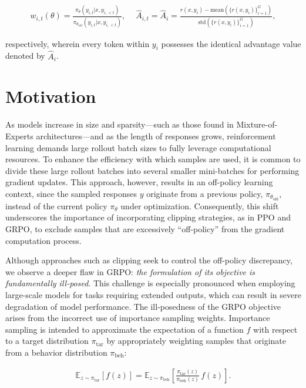 \begin{align}
    w_{i,t}(\theta)=\frac{ \pi_{\theta} (y_{i,t} | x, y_{i,<t}) }{ \pi_{\theta_\text{old}} (y_{i,t} | x,y_{i,<t})},\quad\ 
    \widehat{A}_{i,t} = \widehat{A}_{i} = \frac{r(x, y_i) - \mathrm{mean} \left( \{ r(x, y_i) \}_{i=1}^G \right) }{ \mathrm{std} \left( \{ r(x, y_i) \}_{i=1}^G \right) },
\end{align}

respectively, wherein every token within $y_i$ possesses the identical advantage value denoted by $\widehat{A}_{i}$.

\section{Motivation}
\label{sec:motivation}

As models increase in size and sparsity—such as those found in Mixture-of-Experts architectures—and as the length of responses grows, reinforcement learning demands large rollout batch sizes to fully leverage computational resources. To enhance the efficiency with which samples are used, it is common to divide these large rollout batches into several smaller mini-batches for performing gradient updates. This approach, however, results in an off-policy learning context, since the sampled responses $y$ originate from a previous policy, $\pi_{\theta_\text{old}}$, instead of the current policy $\pi_\theta$ under optimization. Consequently, this shift underscores the importance of incorporating clipping strategies, as in PPO and GRPO, to exclude samples that are excessively ``off-policy'' from the gradient computation process.

Although approaches such as clipping seek to control the off-policy discrepancy, we observe a deeper flaw in GRPO: \textit{the formulation of its objective is fundamentally ill-posed}. This challenge is especially pronounced when employing large-scale models for tasks requiring extended outputs, which can result in severe degradation of model performance. The ill-posedness of the GRPO objective arises from the incorrect use of importance sampling weights. Importance sampling is intended to approximate the expectation of a function $f$ with respect to a target distribution $\pi_\text{tar}$ by appropriately weighting samples that originate from a behavior distribution $\pi_\text{beh}$:

\begin{align}
\mathbb{E}_{z \sim \pi_\text{tar}} \left[ f(z) \right] = \mathbb{E}_{z \sim \pi_\text{beh}} \left[ \frac{ \pi_\text{tar} (z) }{ \pi_\text{beh} (z)} \, f(z) \right].
\end{align}

